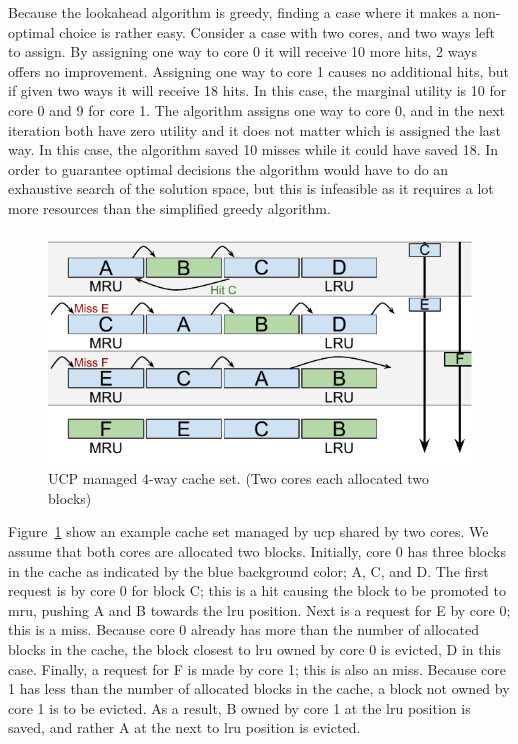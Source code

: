 Because the lookahead algorithm is greedy, finding a case where it makes a non-optimal choice is rather easy.
Consider a case with two cores, and two ways left to assign.
By assigning one way to core 0 it will receive 10 more hits, 2 ways offers no improvement.
Assigning one way to core 1 causes no additional hits, but if given two ways it will receive 18 hits.
In this case, the marginal utility is 10 for core 0 and 9 for core 1.
The algorithm assigns one way to core 0, and in the next iteration both have zero utility and it does not matter which is assigned the last way.
In this case, the algorithm saved 10 misses while it could have saved 18.
In order to guarantee optimal decisions the algorithm would have to do an exhaustive search of the solution space, but this is infeasible as it requires a lot more resources than the simplified greedy algorithm.

\begin{figure}[ht]
    \centering
    \includegraphics[width=.65\textwidth]{figures/algorithms/UCP}
    \caption[UCP managed 4-way cache set.]{UCP managed 4-way cache set. (Two cores each allocated two blocks)}
    \label{fig:algorithms:ucp_example}
\end{figure}

Figure~\ref{fig:algorithms:ucp_example} show an example cache set managed by \gls{ucp} shared by two cores.
We assume that both cores are allocated two blocks.
Initially, core 0 has three blocks in the cache as indicated by the blue background color; A, C, and D.
The first request is by core 0 for block C; this is a hit causing the block to be promoted to \gls{mru}, pushing A and B towards the \gls{lru} position.
Next is a request for E by core 0; this is a miss.
Because core 0 already has more than the number of allocated blocks in the cache, the block closest to \gls{lru} owned by core 0 is evicted, D in this case.
Finally, a request for F is made by core 1; this is also an miss.
Because core 1 has less than the number of allocated blocks in the cache, a block not owned by core 1 is to be evicted.
As a result, B owned by core 1 at the \gls{lru} position is saved, and rather A at the next to \gls{lru} position is evicted.



